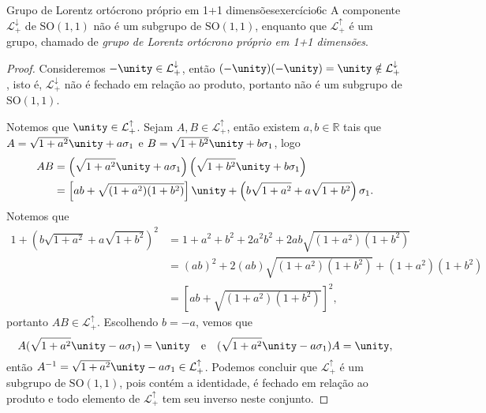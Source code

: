\begin{proposition}{Grupo de Lorentz ortócrono próprio em 1+1 dimensões}{exercício6c}
    A componente \(\mathcal{L}_+^\downarrow\) de \(\mathrm{SO}(1,1)\) não é um subgrupo de \(\mathrm{SO}(1,1)\), enquanto que \(\mathcal{L}_+^\uparrow\) é um grupo, chamado de \emph{grupo de Lorentz ortócrono próprio em 1+1 dimensões}.
\end{proposition}
\begin{proof}
    Consideremos \(-\unity \in \mathcal{L}_+^\downarrow\), então \((-\unity)(-\unity) = \unity \notin \mathcal{L}_+^\downarrow\), isto é, \(\mathcal{L}_+^\downarrow\) não é fechado em relação ao produto, portanto não é um subgrupo de \(\mathrm{SO}(1,1)\).

    Notemos que \(\unity \in \mathcal{L}_+^\uparrow\). Sejam \(A, B \in \mathcal{L}_+^\uparrow\), então existem \(a, b\in \mathbb{R}\) tais que \(A = \sqrt{1 + a^2} \unity + a \sigma_1\) e \(B = \sqrt{1 + b^2} \unity + b \sigma_1\), logo
    \begin{align*}
        AB &= \left(\sqrt{1 + a^2} \unity + a \sigma_1\right)\left(\sqrt{1 + b^2} \unity + b \sigma_1\right)\\
           &= \left[ab+ \sqrt{(1 + a^2)(1 + b^2)}\right]\unity + \left(b\sqrt{1 + a^2}+a\sqrt{1 + b^2}\right)\sigma_1.
    \end{align*}
    Notemos que
    \begin{align*}
        1 + \left(b\sqrt{1 + a^2}+a\sqrt{1 + b^2}\right)^2 &= 1 + a^2 + b^2 + 2a^2 b^2 + 2ab \sqrt{(1 + a^2) (1 + b^2)}\\
                                                           &= (ab)^2 + 2(ab)\sqrt{(1 + a^2)(1 + b^2)} + (1 + a^2)(1 + b^2)\\
                                                           &= \left[ab + \sqrt{(1 + a^2)(1 + b^2)}\right]^2,
    \end{align*}
    portanto \(AB \in \mathcal{L}_+^\uparrow\). Escolhendo \(b = -a\), vemos que
    \begin{equation*}
        A(\sqrt{1 + a^2}\unity - a \sigma_1) = \unity\quad\text{e}\quad (\sqrt{1 + a^2} \unity - a\sigma_1)A = \unity,
    \end{equation*}
    então \(A^{-1} = \sqrt{1 + a^2}\unity - a\sigma_1 \in \mathcal{L}_+^\uparrow\). Podemos concluir que \(\mathcal{L}_+^\uparrow\) é um subgrupo de \(\mathrm{SO}(1,1)\), pois contém a identidade, é fechado em relação ao produto e todo elemento de \(\mathcal{L}_+^\uparrow\) tem seu inverso neste conjunto.
\end{proof}

